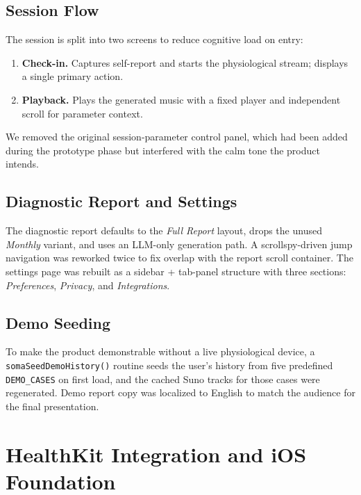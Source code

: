 \documentclass[11pt,a4paper]{article}
\begin{document}
\subsection{Session Flow}

The session is split into two screens to reduce cognitive load on entry:

\begin{enumerate}[leftmargin=*]
  \item \textbf{Check-in.} Captures self-report and starts the physiological
    stream; displays a single primary action.
  \item \textbf{Playback.} Plays the generated music with a fixed player and
    independent scroll for parameter context.
\end{enumerate}

We removed the original session-parameter control panel, which had been added
during the prototype phase but interfered with the calm tone the product
intends.

\subsection{Diagnostic Report and Settings}

The diagnostic report defaults to the \emph{Full Report} layout, drops the
unused \emph{Monthly} variant, and uses an LLM-only generation path. A
scrollspy-driven jump navigation was reworked twice to fix overlap with the
report scroll container. The settings page was rebuilt as a sidebar +
tab-panel structure with three sections: \emph{Preferences}, \emph{Privacy},
and \emph{Integrations}.

\subsection{Demo Seeding}

To make the product demonstrable without a live physiological device, a
\texttt{somaSeedDemoHistory()} routine seeds the user's history from five
predefined \texttt{DEMO\_CASES} on first load, and the cached Suno tracks for
those cases were regenerated. Demo report copy was localized to English to
match the audience for the final presentation.

\section{HealthKit Integration and iOS Foundation}
\end{document}
